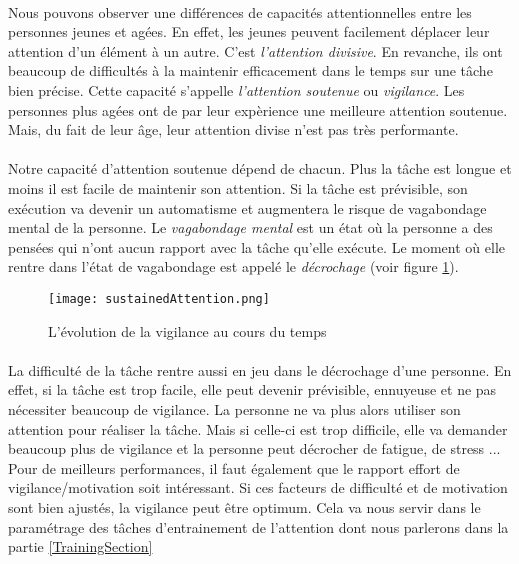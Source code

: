 \paragraph{}Nous pouvons observer une différences de capacités attentionnelles entre les personnes jeunes et agées. En effet, les jeunes peuvent facilement déplacer leur attention
d'un élément à un autre. C'est \emph{l'attention divisive}. En revanche, ils ont beaucoup de difficultés à la maintenir efficacement dans le temps sur une tâche bien précise. Cette capacité
s'appelle \emph{l'attention soutenue} ou \emph{vigilance}. Les personnes plus agées ont de par leur expèrience une meilleure attention soutenue. Mais, du fait de leur âge, leur attention divise n'est pas
très performante.

\paragraph{}Notre capacité d'attention soutenue dépend de chacun. Plus la tâche est longue et moins il est facile de maintenir son attention. Si la tâche est prévisible, son exécution
va devenir un automatisme et augmentera le risque de vagabondage mental de la personne. Le \emph{vagabondage mental} est un état où la personne a des pensées qui n'ont aucun rapport
avec la tâche qu'elle exécute. Le moment où elle rentre dans l'état de vagabondage est appelé le \emph{décrochage} (voir figure \ref{SustainedAttention}).

\begin{figure}[h]
    \begin{center}
    \texttt{[image: sustainedAttention.png]}
    \end{center}
    \caption{L'évolution de la vigilance au cours du temps}
\label{SustainedAttention}
\end{figure}

\paragraph{}La difficulté de la tâche rentre aussi en jeu dans le décrochage d'une personne. En effet, si la tâche est trop facile, elle peut devenir prévisible, ennuyeuse et ne
pas nécessiter beaucoup de vigilance. La personne ne va plus alors utiliser son attention pour réaliser la tâche. Mais si celle-ci est trop difficile, elle va demander beaucoup plus de
vigilance et la personne peut décrocher de fatigue, de stress ... Pour de meilleurs performances, il faut également que le rapport effort de vigilance/motivation soit intéressant. Si
ces facteurs de difficulté et de motivation sont bien ajustés, la vigilance peut être optimum. Cela va nous servir dans le paramétrage des tâches d'entrainement de l'attention dont
nous parlerons dans la partie \ref{TrainingSection}

